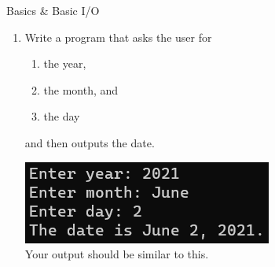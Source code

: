 \documentclass{article}
\begin{document}
\begin{flushright}
Basics \& Basic I/O \end{flushright}

\vspace*{-1.5em}
\noindent\makebox[\linewidth]{\rule{\paperwidth}{0.4pt}}


\vspace*{2em}

\begin{enumerate}



\item Write a program that asks the user for \\
	\begin{minipage}{0.5\textwidth}	
	\vspace*{-0.5em}
		\begin{enumerate}  \setlength\itemsep{-0.3em}
			\item the year,
			\item the month, and
			\item the day	
		\end{enumerate} \vspace*{-1ex}
	and then outputs the date.
	\end{minipage}
	\begin{minipage}{0.5\textwidth}
		\centering
		\includegraphics[scale=0.75]{./imgs/dateOutput.png}\\
		Your output should be similar to this.
	\end{minipage}

	




\end{enumerate}
\end{document}

